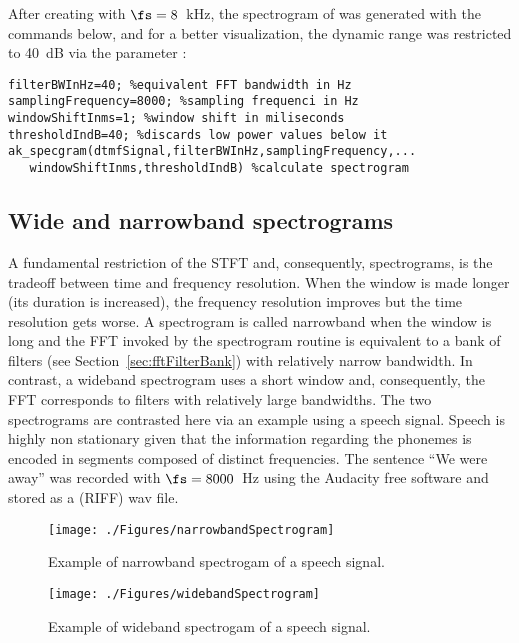 After creating  with $\fs=8$~kHz, the spectrogram of  was generated with the commands below, and for a better visualization, the dynamic range was restricted to 40~dB via the parameter :
\begin{lstlisting}
filterBWInHz=40; %equivalent FFT bandwidth in Hz
samplingFrequency=8000; %sampling frequenci in Hz
windowShiftInms=1; %window shift in miliseconds
thresholdIndB=40; %discards low power values below it
ak_specgram(dtmfSignal,filterBWInHz,samplingFrequency,...
   windowShiftInms,thresholdIndB) %calculate spectrogram
\end{lstlisting}

\subsection{{\akadvanced} Wide and narrowband spectrograms}

A fundamental restriction of the STFT and, consequently, spectrograms, is the tradeoff between time and frequency resolution. When the window is made longer (its duration is increased), the frequency resolution improves but the time resolution gets worse. A spectrogram is called narrowband when the window is long and the FFT invoked by the spectrogram routine is equivalent to a bank of filters (see Section~\ref{sec:fftFilterBank}) with relatively narrow bandwidth. In contrast, a wideband spectrogram uses a short window and, consequently, the FFT corresponds to filters with relatively large bandwidths.
The two spectrograms are contrasted here via an example using a speech signal. Speech is highly non stationary given that the information regarding the phonemes is encoded in segments composed of distinct frequencies. The sentence ``We were away'' was recorded with $\fs=8000$~Hz using the Audacity free software and stored as a (RIFF) wav file.

\begin{figure}[htbp]
\centering
\texttt{[image: ./Figures/narrowbandSpectrogram]}
\caption{Example of narrowband spectrogam of a speech signal.\label{fig:narrowbandSpectrogram}}
\end{figure}

\begin{figure}[htbp]
\centering
\texttt{[image: ./Figures/widebandSpectrogram]}
\caption{Example of wideband spectrogam of a speech signal.\label{fig:widebandSpectrogram}}
\end{figure}

